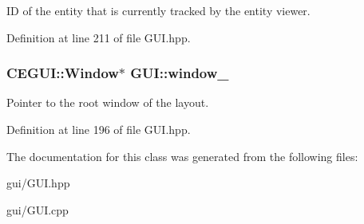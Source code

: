 ID of the entity that is currently tracked by the entity viewer. 



Definition at line 211 of file G\+U\+I.\+hpp.

\subsubsection[{\texorpdfstring{window\+\_\+}{window_}}]{\setlength{\rightskip}{0pt plus 5cm}C\+E\+G\+U\+I\+::\+Window$\ast$ G\+U\+I\+::window\+\_\+\hspace{0.3cm}{\ttfamily [private]}}\hypertarget{class_g_u_i_a1216023a7675f2d5c6f3a33d6f2b9eca}{}\label{class_g_u_i_a1216023a7675f2d5c6f3a33d6f2b9eca}


Pointer to the root window of the layout. 



Definition at line 196 of file G\+U\+I.\+hpp.



The documentation for this class was generated from the following files\+:\begin{DoxyCompactItemize}
\item 
gui/G\+U\+I.\+hpp\item 
gui/G\+U\+I.\+cpp\end{DoxyCompactItemize}
